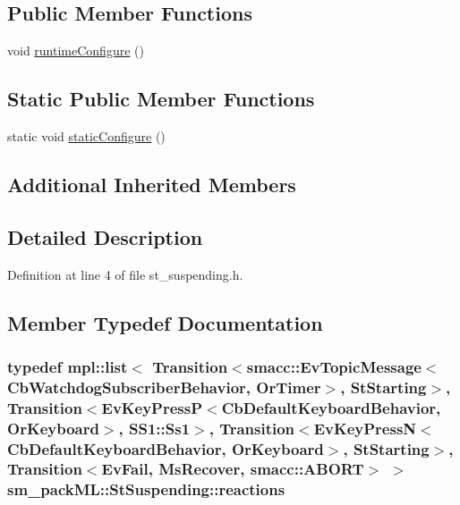 \subsection*{Public Member Functions}
\begin{DoxyCompactItemize}
\item 
void \hyperlink{structsm__packML_1_1StSuspending_a5c6c8a89752377395f61d822a2239f80}{runtime\+Configure} ()
\end{DoxyCompactItemize}
\subsection*{Static Public Member Functions}
\begin{DoxyCompactItemize}
\item 
static void \hyperlink{structsm__packML_1_1StSuspending_a093cc3c1f8a1db5eed1d1af86b548852}{static\+Configure} ()
\end{DoxyCompactItemize}
\subsection*{Additional Inherited Members}


\subsection{Detailed Description}


Definition at line 4 of file st\+\_\+suspending.\+h.



\subsection{Member Typedef Documentation}
\subsubsection[{\texorpdfstring{reactions}{reactions}}]{\setlength{\rightskip}{0pt plus 5cm}typedef mpl\+::list$<$ Transition$<${\bf smacc\+::\+Ev\+Topic\+Message}$<${\bf Cb\+Watchdog\+Subscriber\+Behavior}, {\bf Or\+Timer}$>$, {\bf St\+Starting}$>$, Transition$<$Ev\+Key\+PressP$<$Cb\+Default\+Keyboard\+Behavior, {\bf Or\+Keyboard}$>$, {\bf S\+S1\+::\+Ss1}$>$, Transition$<$Ev\+Key\+PressN$<$Cb\+Default\+Keyboard\+Behavior, {\bf Or\+Keyboard}$>$, {\bf St\+Starting}$>$, Transition$<${\bf Ev\+Fail}, {\bf Ms\+Recover}, {\bf smacc\+::\+A\+B\+O\+RT}$>$ $>$ {\bf sm\+\_\+pack\+M\+L\+::\+St\+Suspending\+::reactions}}\hypertarget{structsm__packML_1_1StSuspending_a4420f6035a11f26b50834a4fa8bee7b7}{}\label{structsm__packML_1_1StSuspending_a4420f6035a11f26b50834a4fa8bee7b7}


